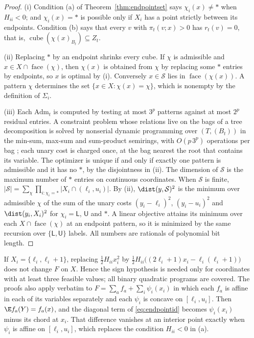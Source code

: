 \begin{proof}
(i) Condition (a) of Theorem~\ref{thm:endpointset} says $\chi_i(x)\ne\ast$
when $H_{ii}<0$; and $\chi_i(x)=\ast$ is possible only if $X_i$ has a point
strictly between its endpoints. Condition (b) says that every $v$ with
$\pi_t(v;x)>0$ has $r_t(v)=0$, that is,
$\operatorname{cube}(\chi(x)_{B_t})\subseteq Z_t$.

(ii) Replacing $\ast$ by an endpoint shrinks every cube. If $\chi$ is
admissible and $x\in X\cap\operatorname{face}(\chi)$, then $\chi(x)$ is
obtained from $\chi$ by replacing some $\ast$ entries by endpoints, so $x$ is
optimal by (i). Conversely $x\in\mathcal S$ lies in
$\operatorname{face}(\chi(x))$. A pattern $\chi$ determines the set
$\{x\in X:\chi(x)=\chi\}$, which is nonempty by the definition of $\Sigma_i$.

(iii) Each $\mathrm{Adm}_t$ is computed by testing at most $3^p$ patterns
against at most $2^p$ residual entries. A constraint problem whose relations
live on the bags of a tree decomposition is solved by nonserial dynamic
programming over $(T,(B_t))$ in the min-sum, max-sum and sum-product
semirings, with $O(p\,3^p)$ operations per bag \cite{Dechter1999}; each unary
cost is charged once, at the bag nearest the root that contains its variable.
The optimizer is unique if and only if exactly one pattern is admissible and
it has no $\ast$, by the disjointness in (ii). The dimension of $\mathcal S$
is the maximum number of $\ast$ entries on continuous coordinates. When
$\mathcal S$ is finite,
$|\mathcal S|=\sum_\chi\prod_{i:\chi_i=\ast}|X_i\cap(\ell_i,u_i)|$. By (ii),
$\dist(y,\mathcal S)^2$ is the minimum over admissible $\chi$ of the sum of
the unary costs $(y_i-\ell_i)^2$, $(y_i-u_i)^2$ and $\dist(y_i,X_i)^2$ for
$\chi_i=\mathsf L$, $\mathsf U$ and $\ast$. A linear objective attains its
minimum over each $X\cap\operatorname{face}(\chi)$ at an endpoint pattern, so
it is minimized by the same recursion over $\{\mathsf L,\mathsf U\}$ labels.
All numbers are rationals of polynomial bit length.
\end{proof}

\begin{remark}\label{rem:endpointext}
If $X_i=\{\ell_i,\ell_i+1\}$, replacing $\frac12H_{ii}x_i^2$ by
$\frac12H_{ii}\bigl((2\ell_i+1)x_i-\ell_i(\ell_i+1)\bigr)$ does not change $F$
on $X$. Hence the sign hypothesis is needed only for coordinates with at least
three feasible values; all binary quadratic programs are covered. The proofs
also apply verbatim to $F=\sum_af_a+\sum_i\psi_i(x_i)$ in which each $f_a$ is
affine in each of its variables separately and each $\psi_i$ is concave on
$[\ell_i,u_i]$. Then $\E f_a(Y)=f_a(x)$, and the diagonal term of
\eqref{eq:endpointid} becomes $\psi_i(x_i)$ minus its chord at $x_i$. That
difference vanishes at an interior point exactly when $\psi_i$ is affine on
$[\ell_i,u_i]$, which replaces the condition $H_{ii}<0$ in (a).
\end{remark}

